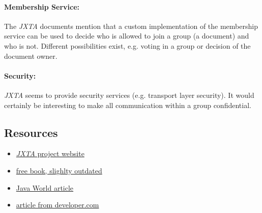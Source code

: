 \paragraph{Membership Service:} The \emph{JXTA} documents mention that a custom implementation of the membership service can be used to decide who is allowed to join a group (a document) and who is not. Different possibilities exist, e.g. voting in a group or decision of the document owner.

\paragraph{Security:} \emph{JXTA} seems to provide security services (e.g. transport layer security). It would certainly be interesting to make all communication within a group confidential.



\subsection{Resources}
\begin{itemize}
 \item \href{http://www.jxta.org/}{\emph{JXTA} project website}
 \item \href{http://www.brendonwilson.com/projects/jxta/}{free book, slighlty outdated}
 \item \href{http://www.javaworld.com/javaworld/jw-05-2005/jw-0509-jxta.html}{Java World article}
 \item \href{http://www.developer.com/java/other/article.php/1450221}{article from developer.com}
\end{itemize}
